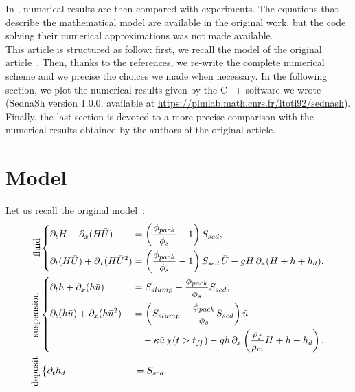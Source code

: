 In \cite{Andrea}, numerical results are then compared with experiments.
The equations that describe the mathematical model are available in the original work, but the code solving their numerical approximations was not made available.\\

This article is structured as follow: first, we recall the model of the original article~\cite{Andrea}. Then, thanks to the references, we re-write the complete numerical scheme and we precise the choices we made when necessary.
In the following section, we plot the numerical results given by the C++ software we wrote (SednaSh version 1.0.0, available at \url{https://plmlab.math.cnrs.fr/ltoti92/sednash}).
Finally, the last section is devoted to a more precise comparison with the numerical results obtained by the authors of the original article.

\section{Model}
Let us recall the original model~\cite[eq.~(10)--(14)]{Andrea}:
\begin{subequations}
\label{eq:model}
\newlength{\mylhs}
\settowidth{\mylhs}{$\partial_t(H\bar{U}) + \partial_x(H\bar{U}^2)$}
\begin{align}
\hspace{-4cm}\text{\rotatebox[origin=c]{90}{fluid}} & \left\{
\begin{aligned}
    \mathmakebox[\mylhs][l]{\partial_t H + \partial_x(H\bar{U})} &= \left( \dfrac{\phi_{pack}}{\phi_s} - 1 \right) S_{sed}, \\
    \mathmakebox[\mylhs][l]{\partial_t(H\bar{U}) + \partial_x(H\bar{U}^2)} &= \left( \dfrac{\phi_{pack}}{\phi_s} - 1 \right) S_{sed} \, \bar{U} - g H \, \partial_x(H + h + h_d),
\end{aligned} \right. \label{eq:fluid} \\
\text{\rotatebox[origin=c]{90}{suspension}} & \left\{
\begin{aligned}
    \mathmakebox[\mylhs][l]{\partial_t h + \partial_x(h\bar{u})} &= S_{slump} - \dfrac{\phi_{pack}}{\phi_s} S_{sed}, \\
    \mathmakebox[\mylhs][l]{\partial_t(h\bar{u}) + \partial_x(h\bar{u}^2)} &= \left( S_{slump} - \dfrac{\phi_{pack}}{\phi_s} S_{sed} \right) \bar{u} \\
    & \quad - \kappa \bar{u} \, \chi(t > t_{f\!f}) - g h \, \partial_x \left( \dfrac{\rho_f}{\rho_m} H + h + h_d \right),
\end{aligned} \right. \label{eq:suspension} \\
\text{\rotatebox[origin=c]{90}{deposit}} & \left\{
\begin{aligned}
    \mathmakebox[\mylhs][l]{\partial_t h_d} \hspace{4.5pt} &= S_{sed}.
\end{aligned} \right. \label{eq:deposit}
\end{align}
\end{subequations}
~\\[-0.7\baselineskip]

